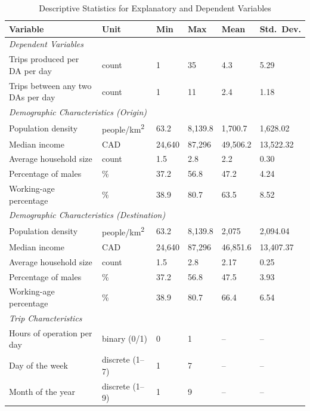 \documentclass[12pt]{article}
\begin{document}
\begin{table}[H]
\centering
\caption{Descriptive Statistics for Explanatory and Dependent Variables}
\label{tab:descriptive-stats}
\small
\begin{tabular}{p{5.3cm}p{2.6cm}p{1cm}p{1cm}p{1.8cm}p{1.5cm}}
\toprule
\textbf{Variable} & \textbf{Unit} & \textbf{Min} & \textbf{Max} & \textbf{Mean} & \textbf{Std.\ Dev.} \\
\midrule
\multicolumn{6}{l}{\textit{Dependent Variables}} \\
Trips produced per DA per day & count & 1 & 35 & 4.3 & 5.29 \\
Trips between any two DAs per day & count & 1 & 11 & 2.4 & 1.18 \\
\multicolumn{6}{l}{\textit{Demographic Characteristics (Origin)}} \\
Population density & people/km\textsuperscript{2} & 63.2 & 8{,}139.8 & 1{,}700.7 & 1{,}628.02 \\
Median income & CAD & 24{,}640 & 87{,}296 & 49{,}506.2 & 13{,}522.32 \\
Average household size & count & 1.5 & 2.8 & 2.2 & 0.30 \\
Percentage of males & \% & 37.2 & 56.8 & 47.2 & 4.24 \\
Working-age percentage & \% & 38.9 & 80.7 & 63.5 & 8.52 \\
\multicolumn{6}{l}{\textit{Demographic Characteristics (Destination)}} \\
Population density & people/km\textsuperscript{2} & 63.2 & 8{,}139.8 & 2{,}075 & 2{,}094.04 \\
Median income & CAD & 24{,}640 & 87{,}296 & 46{,}851.6 & 13{,}407.37 \\
Average household size & count & 1.5 & 2.8 & 2.17 & 0.25 \\
Percentage of males & \% & 37.2 & 56.8 & 47.5 & 3.93 \\
Working-age percentage & \% & 38.9 & 80.7 & 66.4 & 6.54 \\
\multicolumn{6}{l}{\textit{Trip Characteristics}} \\
Hours of operation per day & binary (0/1) & 0 & 1 & -- & -- \\
Day of the week & discrete (1--7) & 1 & 7 & -- & -- \\
Month of the year & discrete (1--9) & 1 & 9 & -- & -- \\
\bottomrule
\end{tabular}
\end{table}
\end{document}
